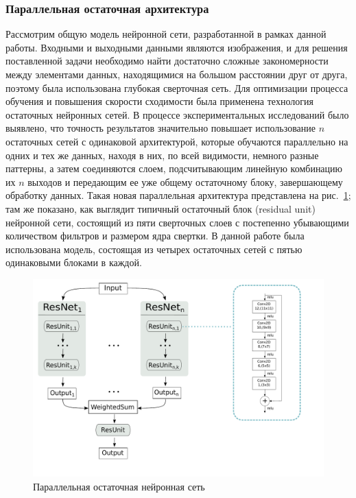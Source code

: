 \subsubsection{Параллельная остаточная архитектура}
Рассмотрим общую модель нейронной сети, разработанной в рамках данной работы. Входными и выходными данными являются изображения, и для решения поставленной задачи необходимо найти достаточно сложные закономерности между элементами данных, находящимися на большом расстоянии друг от друга, поэтому была использована глубокая сверточная сеть. Для оптимизации процесса обучения и повышения скорости сходимости была применена технология остаточных нейронных сетей. В процессе экспериментальных исследований было выявлено, что точность результатов значительно повышает использование $n$ остаточных сетей с одинаковой архитектурой, которые обучаются параллельно на одних и тех же данных, находя в них, по всей видимости, немного разные паттерны, а затем соединяются слоем, подсчитывающим линейную комбинацию их $n$ выходов и передающим ее уже общему остаточному блоку, завершающему обработку данных. Такая новая параллельная архитектура представлена на рис.~\ref{nn}; там же показано, как выглядит типичный остаточный блок (residual unit) нейронной сети, состоящий из пяти сверточных слоев с постепенно убывающими количеством фильтров и размером ядра свертки. В данной работе была использована модель, состоящая из четырех остаточных сетей с пятью одинаковыми блоками в каждой.

\begin{figure}[h]
\begin{center}
\centering
\includegraphics[width=15cm]{pics/nn.pdf}
\caption{Параллельная остаточная нейронная сеть}
\label{nn}
\end{center}
\end{figure} 